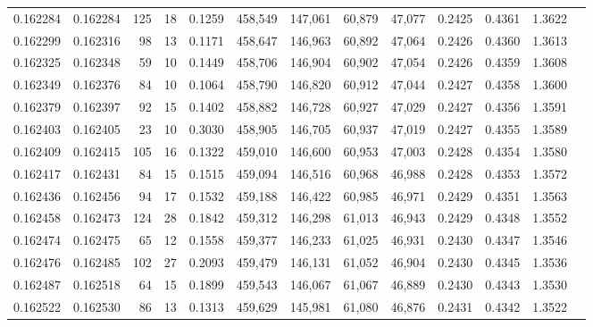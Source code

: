 \begin{tabular}{rrrrrrrrrrrrr}
0.162284 & 0.162284 &   125 &  18 &                                     0.1259 & 458,549 & 147,061 &  60,879 &  47,077 & 0.2425 & 0.4361 & 1.3622 \\
0.162299 & 0.162316 &    98 &  13 &                                     0.1171 & 458,647 & 146,963 &  60,892 &  47,064 & 0.2426 & 0.4360 & 1.3613 \\
0.162325 & 0.162348 &    59 &  10 &                                     0.1449 & 458,706 & 146,904 &  60,902 &  47,054 & 0.2426 & 0.4359 & 1.3608 \\
0.162349 & 0.162376 &    84 &  10 &                                     0.1064 & 458,790 & 146,820 &  60,912 &  47,044 & 0.2427 & 0.4358 & 1.3600 \\
0.162379 & 0.162397 &    92 &  15 &                                     0.1402 & 458,882 & 146,728 &  60,927 &  47,029 & 0.2427 & 0.4356 & 1.3591 \\
0.162403 & 0.162405 &    23 &  10 &                                     0.3030 & 458,905 & 146,705 &  60,937 &  47,019 & 0.2427 & 0.4355 & 1.3589 \\
0.162409 & 0.162415 &   105 &  16 &                                     0.1322 & 459,010 & 146,600 &  60,953 &  47,003 & 0.2428 & 0.4354 & 1.3580 \\
0.162417 & 0.162431 &    84 &  15 &                                     0.1515 & 459,094 & 146,516 &  60,968 &  46,988 & 0.2428 & 0.4353 & 1.3572 \\
0.162436 & 0.162456 &    94 &  17 &                                     0.1532 & 459,188 & 146,422 &  60,985 &  46,971 & 0.2429 & 0.4351 & 1.3563 \\
0.162458 & 0.162473 &   124 &  28 &                                     0.1842 & 459,312 & 146,298 &  61,013 &  46,943 & 0.2429 & 0.4348 & 1.3552 \\
0.162474 & 0.162475 &    65 &  12 &                                     0.1558 & 459,377 & 146,233 &  61,025 &  46,931 & 0.2430 & 0.4347 & 1.3546 \\
0.162476 & 0.162485 &   102 &  27 &                                     0.2093 & 459,479 & 146,131 &  61,052 &  46,904 & 0.2430 & 0.4345 & 1.3536 \\
0.162487 & 0.162518 &    64 &  15 &                                     0.1899 & 459,543 & 146,067 &  61,067 &  46,889 & 0.2430 & 0.4343 & 1.3530 \\
0.162522 & 0.162530 &    86 &  13 &                                     0.1313 & 459,629 & 145,981 &  61,080 &  46,876 & 0.2431 & 0.4342 & 1.3522 \\

\end{tabular}
